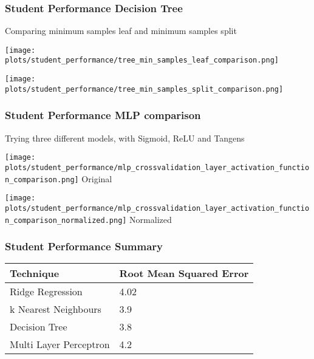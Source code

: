 \documentclass[aspectratio=169]{beamer}
\begin{document}
\begin{frame}{}
\frametitle{Student Performance Decision Tree }
\center Comparing minimum samples leaf and minimum samples split 
\begin{minipage}{0.49\textwidth}
    \texttt{[image: plots/student\_performance/tree\_min\_samples\_leaf\_comparison.png]}
\end{minipage}
\begin{minipage}{0.49\textwidth}
    \texttt{[image: plots/student\_performance/tree\_min\_samples\_split\_comparison.png]}
\end{minipage}
\end{frame}

\begin{frame}{}
\frametitle{Student Performance MLP comparison}
\center Trying three different models, with Sigmoid, ReLU and Tangens
\begin{minipage}{0.49\textwidth}
    \texttt{[image: plots/student\_performance/mlp\_crossvalidation\_layer\_activation\_function\_comparison.png]}
    \center Original
\end{minipage}
\begin{minipage}{0.49\textwidth}
    \texttt{[image: plots/student\_performance/mlp\_crossvalidation\_layer\_activation\_function\_comparison\_normalized.png]}
    \center Normalized
\end{minipage}
\end{frame}

\begin{frame}{}
\frametitle{Student Performance Summary}
\begin{table}[]
\begin{tabular}{ll}
\hline
\textbf{Technique}     & \textbf{Root Mean Squared Error} \\ \hline
Ridge Regression       &                  4.02                \\
k Nearest Neighbours   &                 3.9                 \\
Decision Tree          &                          3.8        \\
Multi Layer Perceptron &                4.2                  \\ \hline
\end{tabular}
\end{table}
\end{frame}


\end{document}
